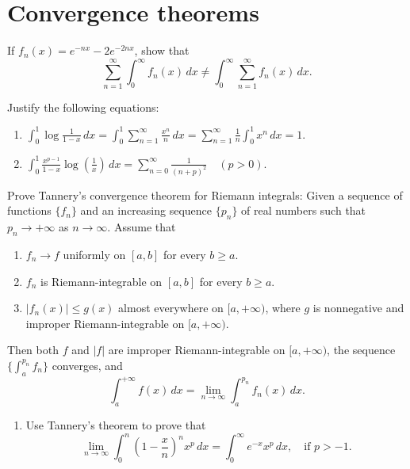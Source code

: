 \section{Convergence theorems}

\begin{problembox}
If $f_n(x) = e^{-nx} - 2e^{-2nx}$, show that 
\[\sum_{n=1}^{\infty} \int_{0}^{\infty} f_n(x) \, dx \neq \int_{0}^{\infty} \sum_{n=1}^{\infty} f_n(x) \, dx.\]
\end{problembox}

\begin{problembox}
Justify the following equations:
\begin{enumerate}[label=(\alph*)]
    \item $\int_{0}^{1} \log \frac{1}{1-x} \, dx = \int_{0}^{1} \sum_{n=1}^{\infty} \frac{x^n}{n} \, dx = \sum_{n=1}^{\infty} \frac{1}{n} \int_{0}^{1} x^n \, dx = 1.$
    \item $\int_{0}^{1} \frac{x^{p-1}}{1-x} \log \left( \frac{1}{x} \right) \, dx = \sum_{n=0}^{\infty} \frac{1}{(n+p)^2} \quad (p > 0).$
\end{enumerate}
\end{problembox}

\begin{problembox}
Prove Tannery's convergence theorem for Riemann integrals: Given a sequence of functions $\{f_n\}$ and an increasing sequence $\{p_n\}$ of real numbers such that $p_n \to +\infty$ as $n \to \infty$. Assume that
\begin{enumerate}[label=(\alph*)]
    \item $f_n \to f$ uniformly on $[a,b]$ for every $b \geq a$.
    \item $f_n$ is Riemann-integrable on $[a,b]$ for every $b \geq a$.
    \item $|f_n(x)| \leq g(x)$ almost everywhere on $[a,+\infty)$, where $g$ is nonnegative and improper Riemann-integrable on $[a,+\infty)$.
\end{enumerate}
Then both $f$ and $|f|$ are improper Riemann-integrable on $[a,+\infty)$, the sequence $\{\int_a^{p_n} f_n\}$ converges, and
\[\int_{a}^{+\infty} f(x) \, dx = \lim_{n \to \infty} \int_{a}^{p_n} f_n(x) \, dx.\]

\begin{enumerate}[label=(\alph*),resume]
    \item Use Tannery's theorem to prove that
    \[\lim_{n \to \infty} \int_{0}^{n} \left( 1 - \frac{x}{n} \right)^n x^p \, dx = \int_{0}^{\infty} e^{-x}x^p \, dx, \quad \text{if } p > -1.\]
\end{enumerate}
\end{problembox}

